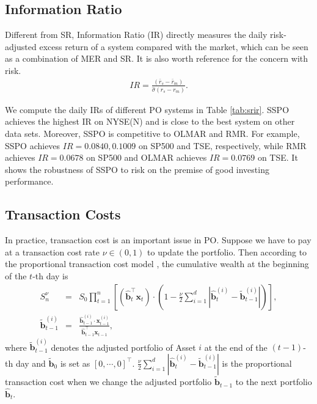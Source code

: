 \documentclass[twoside,11pt]{article}
\begin{document}
\subsection{Information Ratio}
\label{sec:inforatio}
Different from SR, Information Ratio (IR) \citep{inforatio2} directly measures the daily risk-adjusted excess return of a system compared with the market, which can be seen as a combination of MER and SR. It is also worth reference for the concern with risk.
\begin{eqnarray}
\label{eqn:inforatio}
IR=\frac{(\bar{r}_{s}-\bar{r}_{m})}{\hat{\sigma}({r}_{s}-{r}_{m})}.
\end{eqnarray}

We compute the daily IRs of different PO systems in Table \ref{tab:srir}. SSPO achieves the highest IR on NYSE(N) and is close to the best system on other data sets. Moreover, SSPO is competitive to OLMAR and RMR. For example,  SSPO achieves $IR=0.0840, 0.1009$ on SP500 and TSE, respectively, while RMR achieves $IR=0.0678$ on SP500 and OLMAR achieves $IR=0.0769$ on TSE. It shows the robustness of SSPO to risk on the premise of good investing performance.



\subsection{Transaction Costs}
\label{sec:tc}
In practice, transaction cost is an important issue in PO. Suppose we have to pay at a transaction cost rate $\nu\in(0,1)$ to update the portfolio. Then according to the proportional transaction cost model \citep{UPtc,OLMAR,RMR2}, the cumulative wealth at the beginning of the $t$-th day is
\begin{eqnarray}
  S_n^{\nu} &=& S_0\prod_{t=1}^{n}[(\hat{\mathbf{b}}_t^\top\mathbf{x}_t)\cdot
  (1-\frac{\nu}{2}\sum_{i=1}^{d}|\hat{\mathbf{b}}_t^{(i)}-\tilde{\mathbf{b}}_{t-1}^{(i)}|)], \\
  \tilde{\mathbf{b}}_{t-1}^{(i)} &=& \frac{\hat{\mathbf{b}}_{t-1}^{(i)}\cdot\mathbf{x}_{t-1}^{(i)}}{\hat{\mathbf{b}}_{t-1}^\top\mathbf{x}_{t-1}},
\end{eqnarray}
where $\tilde{\mathbf{b}}_{t-1}^{(i)}$ denotes the adjusted portfolio of Asset $i$ at the end of the $(t-1)$-th day and $\tilde{\mathbf{b}}_{0}$ is set as $[0,\cdots,0]^\top$. $\frac{\nu}{2}\sum_{i=1}^{d}|\hat{\mathbf{b}}_t^{(i)}-\tilde{\mathbf{b}}_{t-1}^{(i)}|$ is the proportional transaction cost when we change the adjusted portfolio $\tilde{\mathbf{b}}_{t-1}$ to the next portfolio $\hat{\mathbf{b}}_{t}$.
\end{document}
